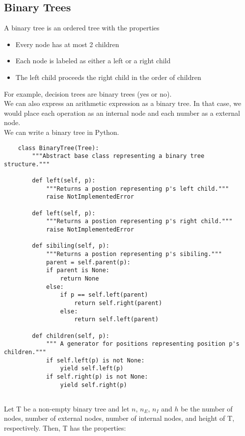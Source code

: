 \documentclass[]{article}
\begin{document}
\subsection{Binary Trees}\bigbreak

A binary tree is an ordered tree with the properties

\begin{itemize}
	\item Every node has at most 2 children
	\item Each node is labeled as either a left or a right child
	\item The left child proceeds the right child in the order of children
\end{itemize}\bigbreak

For example, decision trees are binary trees (yes or no).\\

We can also express an arithmetic expression as a binary tree. In that case, we would place each operation as an internal node and each number as a external node.\\


We can write a binary tree in Python.\\

\begin{lstlisting}
	class BinaryTree(Tree):	
		"""Abstract base class representing a binary tree structure."""
		
		def left(self, p):
			"""Returns a postion representing p's left child."""
			raise NotImplementedError
			
		def left(self, p):
			"""Returns a postion representing p's right child."""
			raise NotImplementedError
			
		def sibiling(self, p):
			"""Returns a postion representing p's sibiling."""
			parent = self.parent(p):
			if parent is None:
				return None
			else:
				if p == self.left(parent)
					return self.right(parent)
				else:
					return self.left(parent)
					
		def children(self, p):
			""" A generator for positions representing position p's children."""
			if self.left(p) is not None:
				yield self.left(p)
			if self.right(p) is not None:
				yield self.right(p)
			
\end{lstlisting}\bigbreak


Let T be a non-empty binary tree and let $n$, $n_E$, $n_I$ and $h$ be the number of nodes, number of external nodes, number of internal nodes, and height of T, respectively. Then, T has the properties:
\end{document}
